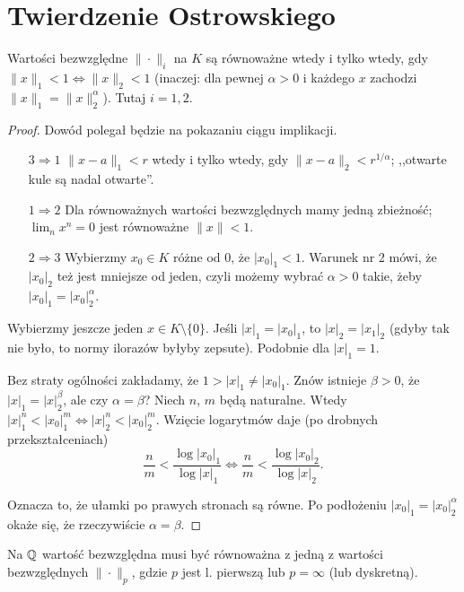\section{Twierdzenie Ostrowskiego}
\begin{lemat}
	Wartości bezwzględne $\|\cdot\|_i$ na $K$ są równoważne wtedy i tylko wtedy, gdy $\|x\|_1 < 1 \Leftrightarrow \|x\|_2<1$ (inaczej: dla pewnej $\alpha > 0$ i każdego $x$ zachodzi $\|x\|_1 = \|x\|_2^\alpha$).
	Tutaj $i = 1, 2$.
\end{lemat}

\begin{proof}
	Dowód polegał będzie na pokazaniu ciągu implikacji.
	\begin{itemize}
		\item [$3 \Rightarrow 1$] $\|x-a\|_1 < r$ wtedy i tylko wtedy, gdy $\|x-a\|_2 < r^{1/\alpha}$; ,,otwarte kule są nadal otwarte''. 
		\item [$1 \Rightarrow 2$] Dla równoważnych wartości bezwzględnych mamy jedną zbieżność; $\lim_n x^n = 0$ jest równoważne $\|x\| < 1$.
		\item [$2 \Rightarrow 3$] 	Wybierzmy $x_0 \in K$ różne od $0$, że $|x_0|_1 < 1$.
	Warunek nr 2 mówi, że $|x_0|_2$ też jest mniejsze od jeden, czyli możemy wybrać $\alpha > 0$ takie, żeby $|x_0|_1 = |x_0|_2^\alpha$.
	\end{itemize}

	Wybierzmy jeszcze jeden $x \in K \setminus \{0\}$.
	Jeśli $|x|_1 = |x_0|_1$, to $|x|_2 = |x_1|_2$ (gdyby tak nie było, to normy ilorazów byłyby zepsute).
	Podobnie dla $|x|_1 = 1$.

	Bez straty ogólności zakładamy, że $1 > |x|_1 \neq |x_0|_1$.
	Znów istnieje $\beta > 0$, że $|x|_1 = |x|_2^\beta$, ale czy $\alpha = \beta$?
	Niech $n$, $m$ będą naturalne.
	Wtedy $|x|_1^n < |x_0|_1^m \iff |x|_2^n < |x_0|_2^m$.
	Wzięcie logarytmów daje (po drobnych przekształceniach)
	\[
		\frac nm < \frac{\log |x_0|_1}{\log |x|_1} \iff \frac n m < \frac{\log |x_0|_2}{\log |x|_2}.
	\]

	Oznacza to, że ułamki po prawych stronach są równe.
	Po podłożeniu $|x_0|_1 = |x_0|_2^\alpha$ okaże się, że rzeczywiście $\alpha = \beta$.
\end{proof}

\begin{twierdzenie}[Ostrowski, 1916]
	Na $\mathbb{Q}$ wartość bezwzględna musi być równoważna z jedną z wartości bezwzględnych $\|\cdot\|_p$, gdzie $p$ jest l. pierwszą lub $p = \infty$ (lub dyskretną).
\end{twierdzenie}

